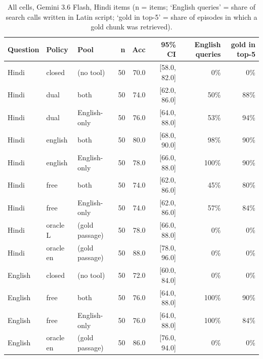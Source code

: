 \begin{table}[htbp]\centering\scriptsize
\begin{tabular}{lllrrrrr}
\toprule
Question & Policy & Pool & n & Acc & 95\% CI & English queries & gold in top-5 \\
\midrule
Hindi & closed & (no tool) & 50 & 70.0 & [58.0, 82.0] & 0\% & 0\% \\
Hindi & dual & both & 50 & 74.0 & [62.0, 86.0] & 50\% & 88\% \\
Hindi & dual & English-only & 50 & 76.0 & [64.0, 88.0] & 53\% & 94\% \\
Hindi & english & both & 50 & 80.0 & [68.0, 90.0] & 98\% & 90\% \\
Hindi & english & English-only & 50 & 78.0 & [66.0, 88.0] & 100\% & 90\% \\
Hindi & free & both & 50 & 74.0 & [62.0, 86.0] & 45\% & 80\% \\
Hindi & free & English-only & 50 & 74.0 & [62.0, 86.0] & 57\% & 84\% \\
Hindi & oracle L & (gold passage) & 50 & 78.0 & [66.0, 88.0] & 0\% & 0\% \\
Hindi & oracle en & (gold passage) & 50 & 88.0 & [78.0, 96.0] & 0\% & 0\% \\
English & closed & (no tool) & 50 & 72.0 & [60.0, 84.0] & 0\% & 0\% \\
English & free & both & 50 & 76.0 & [64.0, 88.0] & 100\% & 90\% \\
English & free & English-only & 50 & 76.0 & [64.0, 88.0] & 100\% & 84\% \\
English & oracle en & (gold passage) & 50 & 86.0 & [76.0, 94.0] & 0\% & 0\% \\
\bottomrule
\end{tabular}
\caption{All cells, Gemini 3.6 Flash, Hindi items (n = items; `English queries' = share of search calls written in Latin script; `gold in top-5' = share of episodes in which a gold chunk was retrieved).}
\end{table}


